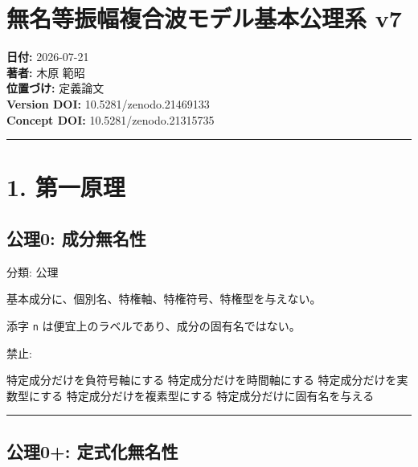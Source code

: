 \documentclass[
  a4paper,
]{ltjsarticle}
\author{}
\date{}
\newenvironment{Shaded}{}{}
\newcommand{\NormalTok}[1]{#1}
\begin{document}
\section{無名等振幅複合波モデル基本公理系
v7}\label{ux7121ux540dux7b49ux632fux5e45ux8907ux5408ux6ce2ux30e2ux30c7ux30ebux57faux672cux516cux7406ux7cfb-v7}

\textbf{日付:} 2026-07-21\\
\textbf{著者:} 木原 範昭\\
\textbf{位置づけ:} 定義論文\\
\textbf{Version DOI:} 10.5281/zenodo.21469133\\
\textbf{Concept DOI:} 10.5281/zenodo.21315735

\begin{center}\rule{0.5\linewidth}{0.5pt}\end{center}

\section{1. 第一原理}\label{ux7b2cux4e00ux539fux7406}

\subsection{公理0:
成分無名性}\label{ux516cux74060-ux6210ux5206ux7121ux540dux6027}

分類: 公理

基本成分に、個別名、特権軸、特権符号、特権型を与えない。

添字 \texttt{n} は便宜上のラベルであり、成分の固有名ではない。

禁止:

\begin{Shaded}
\begin{Highlighting}[]
\NormalTok{特定成分だけを負符号軸にする}
\NormalTok{特定成分だけを時間軸にする}
\NormalTok{特定成分だけを実数型にする}
\NormalTok{特定成分だけを複素型にする}
\NormalTok{特定成分だけに固有名を与える}
\end{Highlighting}
\end{Shaded}

\begin{center}\rule{0.5\linewidth}{0.5pt}\end{center}

\subsection{公理0+:
定式化無名性}\label{ux516cux74060-ux5b9aux5f0fux5316ux7121ux540dux6027}
\end{document}
